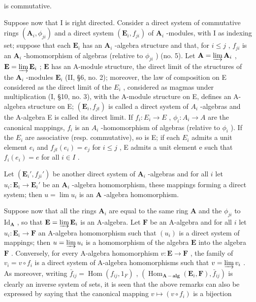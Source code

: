 is commutative.

Suppose now that I is right directed. Consider a direct system of commutative rings \((\mathbf{A}_i, \phi_{ji})\) and a direct system \((\mathbf{E}_i, f_{ji})\) of \(\mathbf{A}_i\) -modules, with I as indexing set; suppose that each \(\mathbf{E}_i\) has an \(\mathbf{A}_i\) -algebra structure and that, for \(i \leqslant j\) , \(f_{ji}\) is an \(\mathbf{A}_i\) -homomorphism of algebras (relative to \(\phi_{ji}\) ) (no. 5). Let \(\mathbf{A} = \varinjlim \mathbf{A}_i\) , \(\mathbf{E} = \varinjlim \mathbf{E}_i\) ; \(\mathbf{E}\) has an A-module structure, the direct limit of the structures of the \(\mathbf{A}_i\) -modules \(\mathbf{E}_i\) (II, §6, no. 2); moreover, the law of composition on E considered as the direct limit of the \(E_{i}\) , considered as magmas under multiplication (I, §10, no. 3), with the A-module structure on E, defines an A-algebra structure on E; \((\mathbf{E}_{i}, f_{jt})\) is called a direct system of \(A_{i}\) -algebras and the A-algebra E is called its direct limit. If \(f_{i}: E_{i} \to E\) , \(\phi_{i}: A_{i} \to A\) are the canonical mappings, \(f_{i}\) is an \(A_{i}\) -homomorphism of algebras (relative to \(\phi_{i}\) ). If the \(E_{i}\) are associative (resp. commutative), so is E; if each \(E_{i}\) admits a unit element \(e_{i}\) and \(f_{jt}(e_{i}) = e_{j}\) for \(i \leqslant j\) , E admits a unit element e such that \(f_{i}(e_{i}) = e\) for all \(i \in I\) .

Let \((\mathbf{E}_i', f_{ji}')\) be another direct system of \(\mathbf{A}_i\) -algebras and for all \(i\) let \(u_i: \mathbf{E}_i \to \mathbf{E}_i'\) be an \(\mathbf{A}_i\) -algebra homomorphism, these mappings forming a direct system; then \(u = \lim u_i\) is an \(\mathbf{A}\) -algebra homomorphism.

Suppose now that all the rings \(\mathbf{A}_i\) are equal to the same ring \(\mathbf{A}\) and the \(\phi_{ji}\) to \(\mathrm{Id}_{\mathbf{A}}\) , so that \(\mathbf{E} = \varinjlim \mathbf{E}_i\) is an A-algebra. Let \(\mathbf{F}\) be an A-algebra and for all \(i\) let \(u_i: \mathbf{E}_i \to \mathbf{F}\) an A-algebra homomorphism such that \((u_i)\) is a direct system of mappings; then \(u = \varinjlim u_i\) is a homomorphism of the algebra \(\mathbf{E}\) into the algebra \(\mathbf{F}\) . Conversely, for every A-algebra homomorphism \(v: \mathbf{E} \to \mathbf{F}\) , the family of \(v_i = v \circ f_i\) is a direct system of A-algebra homomorphisms such that \(v = \varinjlim v_i\) . As moreover, writing \(\bar{f}_{ij} = \operatorname{Hom}(f_{ij}, 1_F)\) , \((\operatorname{Hom}_{\mathbf{A-alg}}(\mathbf{E}_i, \mathbf{F}), \bar{f}_{ij})\) is clearly an inverse system of sets, it is seen that the above remarks can also be expressed by saying that the canonical mapping \(v \mapsto (v \circ f_i)\) is a bijection

